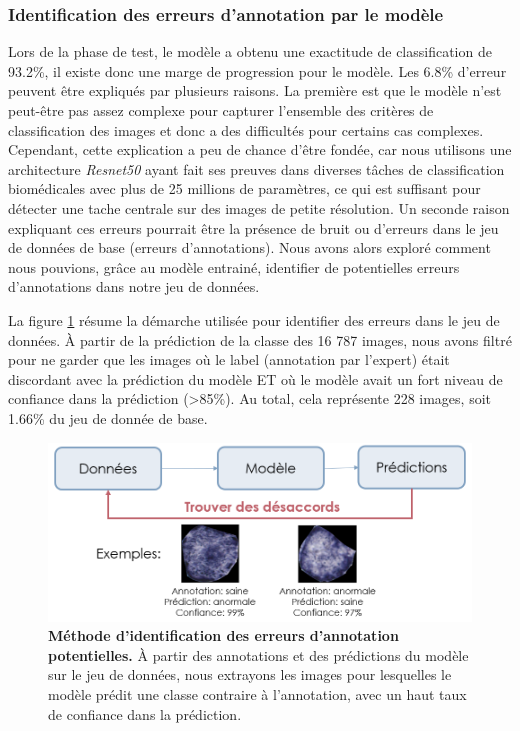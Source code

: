 \subsubsection{Identification des erreurs d'annotation par le modèle}
Lors de la phase de test, le modèle a obtenu une exactitude de classification de 93.2\%, il existe donc une marge de progression pour le modèle. Les 6.8\% d'erreur peuvent être expliqués par plusieurs raisons. La première est que le modèle n'est peut-être pas assez complexe pour capturer l'ensemble des critères de classification des images et donc a des difficultés pour certains cas complexes. Cependant, cette explication a peu de chance d'être fondée, car nous utilisons une architecture \textit{Resnet50} ayant fait ses preuves dans diverses tâches de classification biomédicales avec plus de 25 millions de paramètres, ce qui est suffisant pour détecter une tache centrale sur des images de petite résolution. Un seconde raison expliquant ces erreurs pourrait être la présence de bruit ou d'erreurs dans le jeu de données de base (erreurs d'annotations). Nous avons alors exploré comment nous pouvions, grâce au modèle entrainé, identifier de potentielles erreurs d'annotations dans notre jeu de données.

La figure \ref{fig:identify_errors} résume la démarche utilisée pour identifier des erreurs dans le jeu de données. À partir de la prédiction de la classe des 16 787 images, nous avons filtré pour ne garder que les images où le label (annotation par l'expert) était discordant avec la prédiction du modèle ET où le modèle avait un fort niveau de confiance dans la prédiction (>85\%). Au total, cela représente 228 images, soit 1.66\% du jeu de donnée de base.
\begin{figure}[!htbp]
 \centering
 \includegraphics[width=1\textwidth]{figures/identify_errors.png}
 \caption[Méthode d'identification des potentielles erreurs d'annotation]{\textbf{Méthode d'identification des erreurs d'annotation potentielles.} À partir des annotations et des prédictions du modèle sur le jeu de données, nous extrayons les images pour lesquelles le modèle prédit une classe contraire à l'annotation, avec un haut taux de confiance dans la prédiction.}
 \label{fig:identify_errors}
\end{figure}

